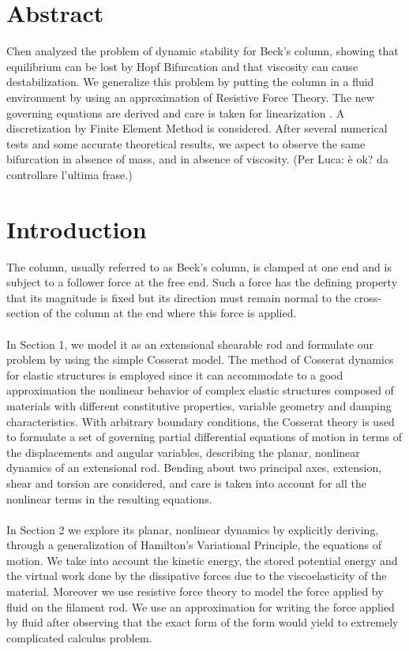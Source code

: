 \documentclass[12pt]{article}
\begin{document}
\section{Abstract}
Chen analyzed the problem of dynamic stability for Beck’s column, showing that equilibrium can be lost by Hopf Bifurcation and that viscosity can cause destabilization. 
We generalize this problem by putting the column in a fluid environment by using an approximation of Resistive Force Theory. The new governing equations are derived and care is taken for    linearization . A discretization by Finite Element Method is considered. After several numerical tests and some accurate theoretical results, we aspect to observe the same bifurcation in absence of mass, and in absence of viscosity. (Per Luca: è ok? da controllare l'ultima frase.)

\section{Introduction}
The column, usually referred to as Beek's column, is clamped at one end and is subject to a follower force at the  free end.
Such a force has the defining property that its magnitude is fixed but its direction must remain normal to the cross-section of the column at the end where this force is applied.
\\\\
In Section 1, we model it as an extensional shearable rod and formulate our problem by using the simple Cosserat model. 
The method of Cosserat dynamics for elastic structures is employed since it can accommodate to a good approximation the nonlinear behavior of complex elastic structures composed of materials with different constitutive properties, variable geometry and damping characteristics. With arbitrary boundary conditions, the Cosserat theory is used to formulate a set of governing partial differential equations of motion in terms of the displacements and angular variables, describing the planar, nonlinear dynamics of an extensional rod. Bending about two principal axes, extension, shear and torsion are considered, and care is taken into account for all the nonlinear terms in the resulting equations. 
\\\\
In Section 2 we explore its planar, nonlinear dynamics by explicitly deriving, through a generalization of Hamilton's Variational Principle, the equations of motion. We take into account the kinetic energy, the stored potential energy and the virtual work done by the dissipative forces due to the viscoelasticity of the material. Moreover we use resistive force theory to model the force applied by fluid on the filament rod. We use an approximation for writing the force applied by fluid after observing that the exact form of the form would yield to extremely complicated calculus problem. 
\end{document}
